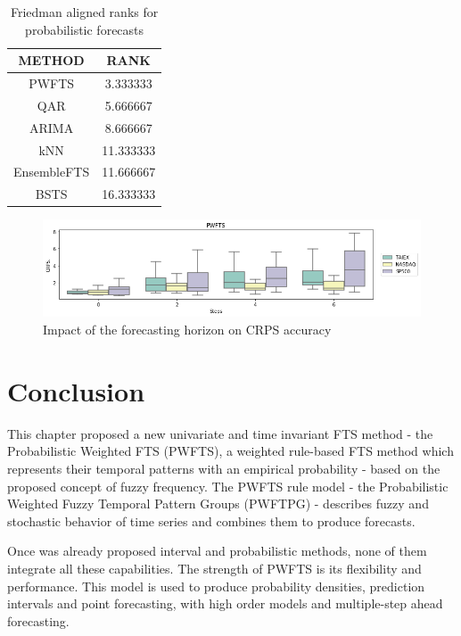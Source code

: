 \begin{table}[hbt]
    \centering
    \begin{tabular}{|c|c|}
\hline
       METHOD &       RANK \\
\hline
PWFTS &   3.333333 \\
QAR &   5.666667 \\
ARIMA &   8.666667 \\
kNN &  11.333333 \\
EnsembleFTS &  11.666667 \\
BSTS &  16.333333 \\
\bottomrule
\end{tabular}
    \caption{Friedman aligned ranks for probabilistic forecasts }
    \label{tab:pwfts_probabilistic_ranks}
\end{table}

\begin{figure}[htb]
    \centering
    \includegraphics[width=\textwidth]{figures/pwfts_ahead_probabilistic.png}
    \caption{Impact of the forecasting horizon on CRPS accuracy}
    \label{fig:pwfts_ahead_probabilistic}
\end{figure}

\section{Conclusion}
\label{sec:pwfts_conclusion}

This chapter proposed a new univariate and time invariant FTS method - the Probabilistic Weighted FTS (PWFTS), a weighted rule-based FTS method which represents their temporal patterns with an empirical probability - based on the proposed concept of fuzzy frequency. The PWFTS rule model - the Probabilistic Weighted Fuzzy Temporal Pattern Groups (PWFTPG) - describes fuzzy and stochastic behavior of time series and combines them to produce forecasts. 

Once was already proposed interval and probabilistic methods, none of them integrate all these capabilities. The strength of PWFTS is its flexibility and performance. This model is used to produce probability densities, prediction intervals and point forecasting, with high order models and multiple-step ahead forecasting.  

